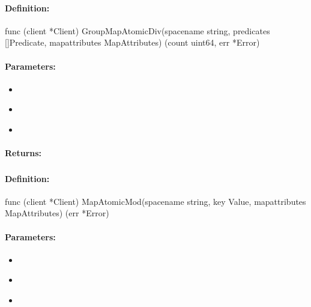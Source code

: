 \paragraph{Definition:}
\begin{gocode}
func (client *Client) GroupMapAtomicDiv(spacename string, predicates []Predicate, mapattributes MapAttributes) (count uint64, err *Error)
\end{gocode}

\paragraph{Parameters:}
\begin{itemize}[noitemsep]
\item {}\\

\item {}\\

\item {}\\

\end{itemize}

\paragraph{Returns:}


\pagebreak
\subsubsection{}
\label{api:Go:MapAtomicMod}


\paragraph{Definition:}
\begin{gocode}
func (client *Client) MapAtomicMod(spacename string, key Value, mapattributes MapAttributes) (err *Error)
\end{gocode}

\paragraph{Parameters:}
\begin{itemize}[noitemsep]
\item {}\\

\item {}\\

\item {}\\

\end{itemize}

